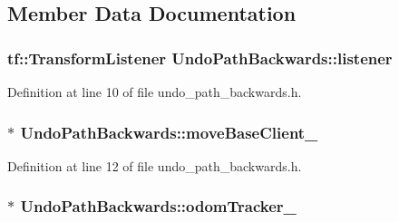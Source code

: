 \subsection{Member Data Documentation}
\subsubsection[{\texorpdfstring{listener}{listener}}]{\setlength{\rightskip}{0pt plus 5cm}tf\+::\+Transform\+Listener Undo\+Path\+Backwards\+::listener\hspace{0.3cm}{\ttfamily [private]}}\hypertarget{classUndoPathBackwards_a482530dc30c268b6c5298b78abfe9d8b}{}\label{classUndoPathBackwards_a482530dc30c268b6c5298b78abfe9d8b}


Definition at line 10 of file undo\+\_\+path\+\_\+backwards.\+h.

\subsubsection[{\texorpdfstring{move\+Base\+Client\+\_\+}{moveBaseClient_}}]{$\ast$ Undo\+Path\+Backwards\+::move\+Base\+Client\+\_\+\hspace{0.3cm}{\ttfamily [private]}}\hypertarget{classUndoPathBackwards_ac9b783f5d06850fe1c3f03bb1308ca2f}{}\label{classUndoPathBackwards_ac9b783f5d06850fe1c3f03bb1308ca2f}


Definition at line 12 of file undo\+\_\+path\+\_\+backwards.\+h.

\subsubsection[{\texorpdfstring{odom\+Tracker\+\_\+}{odomTracker_}}]{$\ast$ Undo\+Path\+Backwards\+::odom\+Tracker\+\_\+\hspace{0.3cm}{\ttfamily [private]}}\hypertarget{classUndoPathBackwards_a7700dd293e08d1383f9e9247329480bc}{}\label{classUndoPathBackwards_a7700dd293e08d1383f9e9247329480bc}


